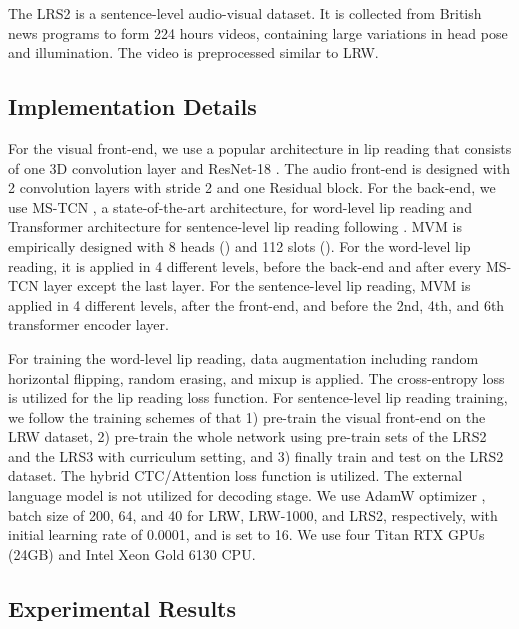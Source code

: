 \documentclass[letterpaper]{article} \usepackage{aaai22}  \usepackage{times}  \usepackage{helvet}  \usepackage{courier}  \usepackage[hyphens]{url}  \usepackage{graphicx} \urlstyle{rm} \def\UrlFont{\rm}  \usepackage{natbib}  \usepackage{caption} \DeclareCaptionStyle{ruled}{labelfont=normalfont,labelsep=colon,strut=off} \frenchspacing  \setlength{\pdfpagewidth}{8.5in}  \setlength{\pdfpageheight}{11in}  \usepackage{algorithm}
\begin{document}
The LRS2 is a sentence-level audio-visual dataset. It is collected from British news programs to form 224 hours videos, containing large variations in head pose and illumination. The video is preprocessed similar to LRW.

\subsection{Implementation Details}
For the visual front-end, we use a popular architecture in lip reading that consists of one 3D convolution layer and ResNet-18 \cite{petridis2017resnetlstm}. The audio front-end is designed with 2 convolution layers with stride 2 and one Residual block. For the back-end, we use MS-TCN \cite{martinez2020mstcn}, a state-of-the-art architecture, for word-level lip reading and Transformer \cite{vaswani2017attention} architecture for sentence-level lip reading following \cite{afouras2018deep}. MVM is empirically designed with 8 heads () and 112 slots (). For the word-level lip reading, it is applied in 4 different levels, before the back-end and after every MS-TCN layer except the last layer. For the sentence-level lip reading, MVM is applied in 4 different levels, after the front-end, and before the 2nd, 4th, and 6th transformer encoder layer.

For training the word-level lip reading, data augmentation including random horizontal flipping, random erasing, and mixup \cite{zhang2017mixup, ma2021bornagain} is applied. The cross-entropy loss is utilized for the lip reading loss function. For sentence-level lip reading training, we follow the training schemes of \cite{zhang2019spatio, chung2017lrs2, afouras2018deep} that 1) pre-train the visual front-end on the LRW dataset, 2) pre-train the whole network using pre-train sets of the LRS2 and the LRS3 with curriculum setting, and 3) finally train and test on the LRS2 dataset. The hybrid CTC/Attention \cite{watanabe2017hybrid} loss function is utilized. The external language model is not utilized for decoding stage. We use AdamW optimizer \cite{loshchilov2017adamw}, batch size of 200, 64, and 40 for LRW, LRW-1000, and LRS2, respectively, with initial learning rate of 0.0001, and  is set to 16. We use four Titan RTX GPUs (24GB) and Intel Xeon Gold 6130 CPU.

\subsection{Experimental Results}
\end{document}

